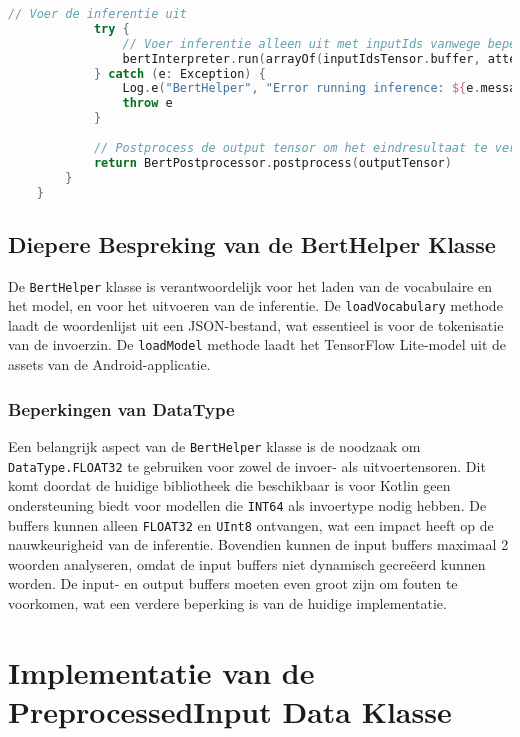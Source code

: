 \begin{lstlisting}[language=Kotlin, caption={Implementatie van BertHelper}]
            // Voer de inferentie uit
            try {
                // Voer inferentie alleen uit met inputIds vanwege beperkingen van de bibliotheek
                bertInterpreter.run(arrayOf(inputIdsTensor.buffer, attentionMaskTensor.buffer), outputTensor.buffer)
            } catch (e: Exception) {
                Log.e("BertHelper", "Error running inference: ${e.message}")
                throw e
            }
            
            // Postprocess de output tensor om het eindresultaat te verkrijgen
            return BertPostprocessor.postprocess(outputTensor)
        }
    }
\end{lstlisting}

\subsection{Diepere Bespreking van de BertHelper Klasse}

De \texttt{BertHelper} klasse is verantwoordelijk voor het laden van de vocabulaire en het model, en voor het uitvoeren van de inferentie. De \texttt{loadVocabulary} methode laadt de woordenlijst uit een JSON-bestand, wat essentieel is voor de tokenisatie van de invoerzin. De \texttt{loadModel} methode laadt het TensorFlow Lite-model uit de assets van de Android-applicatie.

\subsubsection{Beperkingen van DataType}

Een belangrijk aspect van de \texttt{BertHelper} klasse is de noodzaak om \hfill \break \texttt{DataType.FLOAT32} te gebruiken voor zowel de invoer- als uitvoertensoren. Dit komt doordat de huidige bibliotheek die beschikbaar is voor Kotlin geen ondersteuning biedt voor modellen die \texttt{INT64} als invoertype nodig hebben. De buffers kunnen alleen \texttt{FLOAT32} en \texttt{UInt8} ontvangen, wat een impact heeft op de nauwkeurigheid van de inferentie. Bovendien kunnen de input buffers maximaal 2 woorden analyseren, omdat de input buffers niet dynamisch gecreëerd kunnen worden. De input- en output buffers moeten even groot zijn om fouten te voorkomen, wat een verdere beperking is van de huidige implementatie.

\section{Implementatie van de PreprocessedInput Data Klasse}

